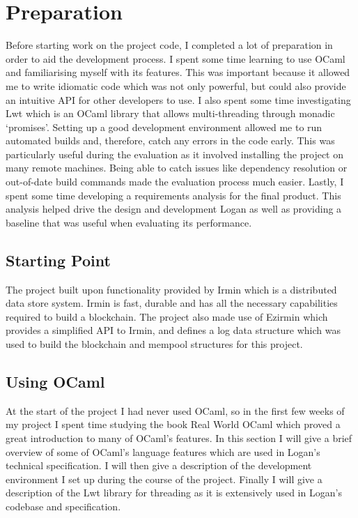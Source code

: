 \documentclass[12pt,a4paper,twoside,openright]{report}
\begin{document}
	\chapter{Preparation}
	Before starting work on the project code, I completed a lot of preparation in order to aid the development process.
	I spent some time learning to use OCaml and familiarising myself with its features.
	This was important because it allowed me to write idiomatic code which was not only powerful, but could also provide an intuitive API for other developers to use.
	I also spent some time investigating Lwt which is an OCaml library that allows multi-threading through monadic `promises'.
	Setting up a good development environment allowed me to run automated builds and, therefore, catch any errors in the code early.
	This was particularly useful during the evaluation as it involved installing the project on many remote machines.
	Being able to catch issues like dependency resolution or out-of-date build commands made the evaluation process much easier.
	Lastly, I spent some time developing a requirements analysis for the final product. 
	This analysis helped drive the design and development Logan as well as providing a baseline that was useful when evaluating its performance.

	\section{Starting Point}
	The project built upon functionality provided by Irmin \parencite{Irmin} which is a distributed data store system. Irmin is fast, durable and has all the necessary capabilities required to build a blockchain.
	The project also made use of Ezirmin \parencite{Ezirmin} which provides a simplified API to Irmin, and defines a log data structure which was used to build the blockchain and mempool structures for this project. 

	\section{Using OCaml}
	At the start of the project I had never used OCaml, so in the first few weeks of my project I spent time studying the book Real World OCaml \parencite{RealWorldOCaml} which proved a great introduction to many of OCaml's features.  
	In this section I will give a brief overview of some of OCaml's language features which are used in Logan's technical specification.
	I will then give a description of the development environment I set up during the course of the project.
	Finally I will give a description of the Lwt library for threading as it is extensively used in Logan's codebase and specification.
\end{document}
